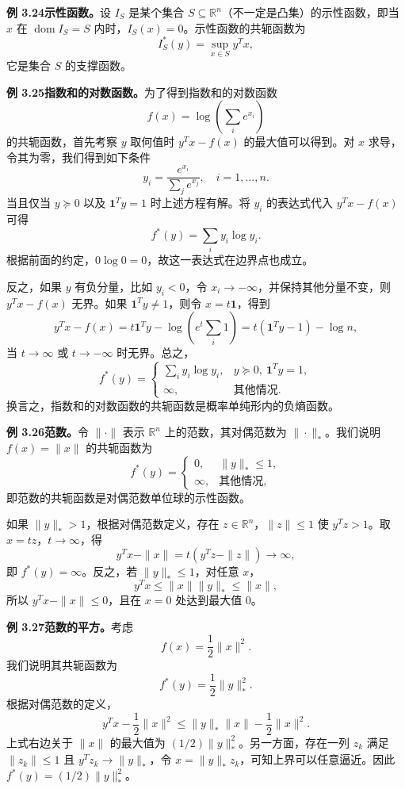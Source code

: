 \documentclass[UTF8, 12pt, fontset=fandol, oneside]{ctexart}
\DeclareMathOperator{\dom}{dom}
\begin{document}
\noindent\textbf{例 3.24\quad 示性函数。}\quad 设 $I_S$ 是某个集合 $S\subseteq\mathbb{R}^n$（不一定是凸集）的示性函数，即当 $x$ 在 $\dom I_S=S$ 内时，$I_S(x)=0$。示性函数的共轭函数为
\[
I_S^*(y)=\sup_{x\in S}y^Tx,
\]
它是集合 $S$ 的支撑函数。

\noindent\textbf{例 3.25\quad 指数和的对数函数。}\quad 为了得到指数和的对数函数
\[
f(x)=\log\left(\sum_i e^{x_i}\right)
\]
的共轭函数，首先考察 $y$ 取何值时 $y^Tx-f(x)$ 的最大值可以得到。对 $x$ 求导，令其为零，我们得到如下条件
\[
y_i=\frac{e^{x_i}}{\sum_j e^{x_j}},\quad i=1,\ldots,n.
\]
当且仅当 $y\succeq0$ 以及 $\mathbf{1}^Ty=1$ 时上述方程有解。将 $y_i$ 的表达式代入 $y^Tx-f(x)$ 可得
\[
f^*(y)=\sum_i y_i\log y_i.
\]
根据前面的约定，$0\log0=0$，故这一表达式在边界点也成立。

反之，如果 $y$ 有负分量，比如 $y_i<0$，令 $x_i\to-\infty$，并保持其他分量不变，则 $y^Tx-f(x)$ 无界。如果 $\mathbf{1}^Ty\neq1$，则令 $x=t\mathbf{1}$，得到
\[
y^Tx-f(x)=t\mathbf{1}^Ty-\log\left(e^t\sum_i1\right)
=t(\mathbf{1}^Ty-1)-\log n,
\]
当 $t\to\infty$ 或 $t\to-\infty$ 时无界。总之，
\[
f^*(y)=
\begin{cases}
\sum_i y_i\log y_i, & y\succeq0,\ \mathbf{1}^Ty=1,\\
\infty, & \text{其他情况}.
\end{cases}
\]
换言之，指数和的对数函数的共轭函数是概率单纯形内的负熵函数。

\noindent\textbf{例 3.26\quad 范数。}\quad 令 $\|\cdot\|$ 表示 $\mathbb{R}^n$ 上的范数，其对偶范数为 $\|\cdot\|_*$。我们说明 $f(x)=\|x\|$ 的共轭函数为
\[
f^*(y)=
\begin{cases}
0, & \|y\|_*\leq1,\\
\infty, & \text{其他情况},
\end{cases}
\]
即范数的共轭函数是对偶范数单位球的示性函数。

如果 $\|y\|_*>1$，根据对偶范数定义，存在 $z\in\mathbb{R}^n$，$\|z\|\leq1$ 使 $y^Tz>1$。取 $x=tz$，$t\to\infty$，得
\[
y^Tx-\|x\|=t(y^Tz-\|z\|)\to\infty,
\]
即 $f^*(y)=\infty$。反之，若 $\|y\|_*\leq1$，对任意 $x$，
\[
y^Tx\leq\|x\|\|y\|_*\leq\|x\|,
\]
所以 $y^Tx-\|x\|\leq0$，且在 $x=0$ 处达到最大值 $0$。

\noindent\textbf{例 3.27\quad 范数的平方。}\quad 考虑
\[
f(x)=\frac{1}{2}\|x\|^2.
\]
我们说明其共轭函数为
\[
f^*(y)=\frac{1}{2}\|y\|_*^2.
\]
根据对偶范数的定义，
\[
y^Tx-\frac{1}{2}\|x\|^2\leq\|y\|_*\|x\|-\frac{1}{2}\|x\|^2.
\]
上式右边关于 $\|x\|$ 的最大值为 $(1/2)\|y\|_*^2$。另一方面，存在一列 $z_k$ 满足 $\|z_k\|\leq1$ 且 $y^Tz_k\to\|y\|_*$，令 $x=\|y\|_*z_k$，可知上界可以任意逼近。因此 $f^*(y)=(1/2)\|y\|_*^2$。
\end{document}
